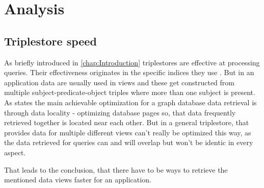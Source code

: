 \chapter{Analysis}
\label{chap:Analysis}

\section{Triplestore speed}
As briefly introduced in \autoref{chap:Introduction} triplestores are effective at processing queries. Their effectiveness originates in the specific indices they use \cite{onlineAllgeroGraphTripleIndices}. But in an application data are usually used in views and these get constructed from multiple subject-predicate-object triples where more than one subject is present.
As \cite{onlineDbisQueryOptimizationInRdf} states the main achievable optimization for a graph database data retrieval is through data locality - optimizing database pages so, that data frequently retrieved together is located near each other. But in a general triplestore, that provides data for multiple different views can't really be optimized this way, as the data retrieved for queries can and will overlap but won't be identic in every aspect.

That leads to the conclusion, that there have to be ways to retrieve the mentioned data views faster for an application.

